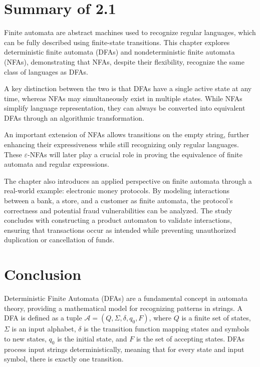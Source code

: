 \documentclass{article}
\begin{document}
\newpage

\section{Summary of 2.1}

Finite automata are abstract machines used to recognize regular languages, which can be fully described using finite-state transitions. This chapter explores deterministic finite automata (DFAs) and nondeterministic finite automata (NFAs), demonstrating that NFAs, despite their flexibility, recognize the same class of languages as DFAs.

A key distinction between the two is that DFAs have a single active state at any time, whereas NFAs may simultaneously exist in multiple states. While NFAs simplify language representation, they can always be converted into equivalent DFAs through an algorithmic transformation.

An important extension of NFAs allows transitions on the empty string, further enhancing their expressiveness while still recognizing only regular languages. These $\varepsilon$-NFAs will later play a crucial role in proving the equivalence of finite automata and regular expressions.

The chapter also introduces an applied perspective on finite automata through a real-world example: electronic money protocols. By modeling interactions between a bank, a store, and a customer as finite automata, the protocol’s correctness and potential fraud vulnerabilities can be analyzed. The study concludes with constructing a product automaton to validate interactions, ensuring that transactions occur as intended while preventing unauthorized duplication or cancellation of funds.

\section{Conclusion}
\maketitle

Deterministic Finite Automata (DFAs) are a fundamental concept in automata theory, providing a mathematical model for recognizing patterns in strings. A DFA is defined as a tuple $\mathcal{A} = (Q, \Sigma, \delta, q_0, F)$, where $Q$ is a finite set of states, $\Sigma$ is an input alphabet, $\delta$ is the transition function mapping states and symbols to new states, $q_0$ is the initial state, and $F$ is the set of accepting states. DFAs process input strings deterministically, meaning that for every state and input symbol, there is exactly one transition.
\end{document}
